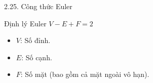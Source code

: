 \documentclass[10pt, xcolor={dvipsnames}]{beamer}
\begin{document}
\begin{frame}{2.25. Công thức Euler}
    \begin{alertblock}{Định lý Euler}
        $V - E + F = 2$
    \end{alertblock}
    \begin{itemize}
        \item $V$: Số đỉnh.
        \item $E$: Số cạnh.
        \item $F$: Số mặt (bao gồm cả mặt ngoài vô hạn).
    \end{itemize}
\end{frame}
\end{document}

